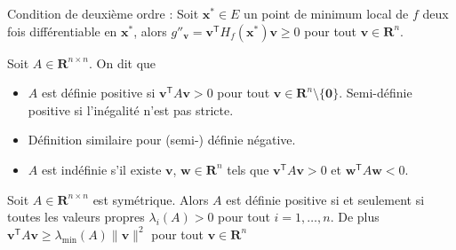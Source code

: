 Condition de deuxième ordre : Soit $\boldsymbol{x}^{*}\in E$ un point de minimum local de $f$ deux fois différentiable en $\boldsymbol{x}^{*}$, alors $g''_{\boldsymbol{v}}=\boldsymbol{v}^{\mathsf{T}}H_{f}(\boldsymbol{x}^{*})\boldsymbol{v}\ge 0$ pour tout $\boldsymbol{v}\in \mathbf{R}^{n}$.
\begin{definition}
Soit $A\in \mathbf{R}^{n\times n}$. On dit que
\begin{itemize}
\item $A$ est définie positive si $\boldsymbol{v}^{\mathsf{T}}A\boldsymbol{v}>0$ pour tout $\boldsymbol{v}\in \mathbf{R}^{n}\setminus \{ \boldsymbol{0} \}$. Semi-définie positive si l'inégalité n'est pas stricte.
\item Définition similaire pour (semi-) définie négative.
\item $A$ est indéfinie s'il existe $\boldsymbol{v}$, $\boldsymbol{w}\in \mathbf{R}^{n}$ tels que $\boldsymbol{v}^{\mathsf{T}}A\boldsymbol{v}>0$ et $\boldsymbol{w}^{\mathsf{T}}A\boldsymbol{w}<0$. 
\end{itemize}
\end{definition}
\begin{lemma}
Soit $A\in \mathbf{R}^{n\times n}$ est symétrique. Alors $A$ est définie positive si et seulement si toutes les valeurs propres $\lambda _{i}(A)>0$ pour tout $i=1,\dots ,n$. De plus $\boldsymbol{v}^{\mathsf{T}}A\boldsymbol{v}\ge \lambda _{\mathrm{min}}(A)\lVert \boldsymbol{v} \rVert^{2}$ pour tout $\boldsymbol{v}\in \mathbf{R}^{n}$
\end{lemma}
